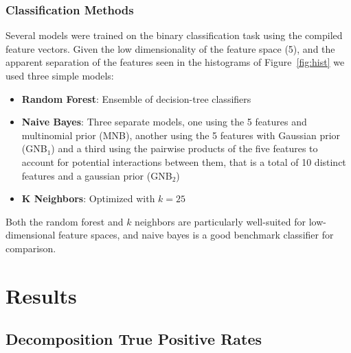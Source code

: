 \documentclass{article} %
\begin{document}
\subsubsection{Classification Methods}
Several models were trained on the binary classification task using the compiled feature vectors.  Given the low dimensionality of the feature space (5), and the apparent separation of the features seen in the histograms of Figure~\ref{fig:hist} we used three simple models:

\begin{itemize}
	\item \textbf{Random Forest}: Ensemble of decision-tree classifiers
	\item \textbf{Naive Bayes}: Three separate models, one using the 5 features and multinomial prior (MNB), another using the 5 features with Gaussian prior (GNB$_1$) and a third using the pairwise products of the five features to account for potential interactions between them, that is a total of 10 distinct features and a gaussian prior (GNB$_2$)
	\item \textbf{K Neighbors}: Optimized with $k=25$
\end{itemize}

Both the random forest and $k$ neighbors are particularly well-suited for low-dimensional feature spaces, and naive bayes is a good benchmark classifier for comparison.

\section{Results}

\subsection{Decomposition True Positive Rates}
\end{document}
